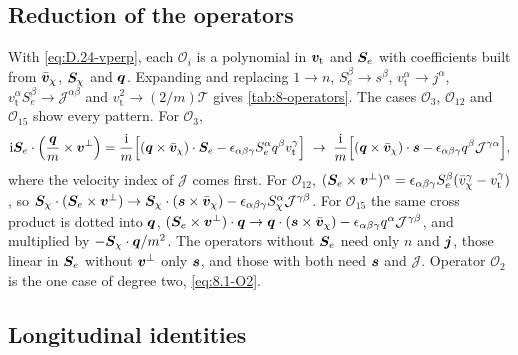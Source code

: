 \subsection{Reduction of the operators}

With \cref{eq:D.24-vperp}, each $\mathcal{O}_i$ is a polynomial in $\bm{v}_{\mathrm{t}}$ and $\bm{S}_e$ with coefficients built from $\bar{\bm{v}}_\chi$, $\bm{S}_\chi$ and $\bm{q}$. Expanding and replacing $1 \to n$, $S^\beta_e \to s^\beta$, $v^\alpha_{\mathrm{t}} \to j^\alpha$, $v^\alpha_{\mathrm{t}}S^\beta_e \to \mathcal{J}^{\alpha\beta}$ and $v_{\mathrm{t}}^2 \to (2/m)\mathcal{T}$ gives \cref{tab:8-operators}. The cases $\mathcal{O}_3$, $\mathcal{O}_{12}$ and $\mathcal{O}_{15}$ show every pattern. For $\mathcal{O}_3$,
\begin{equation*}
  \mathrm{i}\bm{S}_e\cdot\Bigl(\frac{\bm{q}}{m}\times\bm{v}^\perp\Bigr)
  = \frac{\mathrm{i}}{m}\Bigl[(\bm{q}\times\bar{\bm{v}}_\chi)\cdot\bm{S}_e - \epsilon_{\alpha\beta\gamma}S^\alpha_eq^\beta v^\gamma_{\mathrm{t}}\Bigr]
  \;\to\; \frac{\mathrm{i}}{m}\Bigl[(\bm{q}\times\bar{\bm{v}}_\chi)\cdot\bm{s} - \epsilon_{\alpha\beta\gamma}q^\beta\mathcal{J}^{\gamma\alpha}\Bigr] ,
\end{equation*}
where the velocity index of $\mathcal{J}$ comes first. For $\mathcal{O}_{12}$, $(\bm{S}_e\times\bm{v}^\perp)^\alpha = \epsilon_{\alpha\beta\gamma}S^\beta_e(\bar v^\gamma_\chi - v^\gamma_{\mathrm{t}})$, so $\bm{S}_\chi\cdot(\bm{S}_e\times\bm{v}^\perp) \to \bm{S}_\chi\cdot(\bm{s}\times\bar{\bm{v}}_\chi) - \epsilon_{\alpha\beta\gamma}S^\alpha_\chi\mathcal{J}^{\gamma\beta}$. For $\mathcal{O}_{15}$ the same cross product is dotted into $\bm{q}$, $(\bm{S}_e\times\bm{v}^\perp)\cdot\bm{q} \to \bm{q}\cdot(\bm{s}\times\bar{\bm{v}}_\chi) - \epsilon_{\alpha\beta\gamma}q^\alpha\mathcal{J}^{\gamma\beta}$, and multiplied by $-\bm{S}_\chi\cdot\bm{q}/m^2$. The operators without $\bm{S}_e$ need only $n$ and $\bm{j}$, those linear in $\bm{S}_e$ without $\bm{v}^\perp$ only $\bm{s}$, and those with both need $\bm{s}$ and $\mathcal{J}$. Operator $\mathcal{O}_2$ is the one case of degree two, \cref{eq:8.1-O2}.

\subsection{Longitudinal identities}

